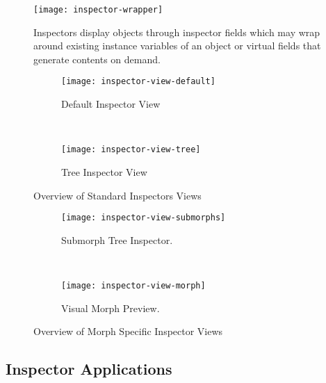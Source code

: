 \begin{figure}[h]
	\centering
	\texttt{[image: inspector-wrapper]}
	\caption[Inspector Model]{Inspectors display objects through inspector fields which may wrap around existing instance variables of an object or virtual fields that generate contents on demand.}
\end{figure}


\begin{figure}[h]
	\centering
	\begin{subfigure}[t]{\textwidth}
		\centering
		\texttt{[image: inspector-view-default]}
		\caption{Default Inspector View}
	\end{subfigure} \\
	\vspace{\baselineskip}
	\begin{subfigure}[t]{\textwidth}
		\centering
		\texttt{[image: inspector-view-tree]}
		\caption{Tree Inspector View}
	\end{subfigure} 

	\caption{Overview of Standard Inspectors Views}
\end{figure}

\begin{figure}[h]
	\centering
	\begin{subfigure}[b]{\textwidth}
		\centering
		\texttt{[image: inspector-view-submorphs]}
		\caption{Submorph Tree Inspector.}
	\end{subfigure}\\
	\vspace{\baselineskip}
	\begin{subfigure}[b]{\textwidth}
		\centering
		\texttt{[image: inspector-view-morph]}
		\caption{Visual Morph Preview.}
	\end{subfigure}
	
	\caption{Overview of Morph Specific Inspector Views}
\end{figure}

\subsection{Inspector Applications}
 \\
 \\

